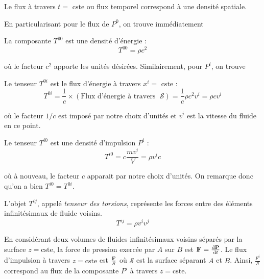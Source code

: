 \begin{theoremframe}
    \begin{defi}
        Le flux à travers $t=\text{ cste}$ ou flux temporel correspond à une densité spatiale. 
    \end{defi}
\end{theoremframe}
En particularisant pour le flux de $P^0$, on trouve immédiatement
\begin{theoremframe}
    \begin{propri}
        La composante $T^{00}$ est une densité d'énergie :
        \begin{equation}
            T^{00}= \rho c^2
        \end{equation}
    \end{propri}
\end{theoremframe}
où le facteur $c^2$ apporte les unités désirées. Similairement, pour $P^i$, on trouve
\begin{theoremframe}
    \begin{propri}
        Le tenseur $T^{0i} $ est le flux d'énergie à travers $x^{i}=\text{ cste}$ :
        \begin{equation}
            T^{0i} =\frac{1}{c} \times (\text{Flux d'énergie à travers } \; \mathcal{S}) = \frac{1}{c} \rho c^2 v^i = \rho c v^i
        \end{equation}
    \end{propri}
\end{theoremframe}
où le facteur $1/c$ est imposé par notre choix d'unités et $v^i$ est la vitesse du fluide en ce point.
\begin{theoremframe}
    \begin{defi}
        Le tenseur $T^{i0}$ est une densité d'impulsion $P^{i}$ :
        \begin{equation}
            T^{i0} = c \frac{m v^i}{V} = \rho v^i c
        \end{equation}
    \end{defi}
\end{theoremframe}
où à nouveau, le facteur $c$ apparait par notre choix d'unités. On remarque donc qu'on a bien $T^{i0} = T^{0i}$.

\begin{theoremframe}
    \begin{defi}
    L'objet $T^{ij}$, appelé \emph{tenseur des torsions}, représente les forces entre des éléments infinitésimaux de fluide voisins.
    \begin{equation}
        T^{ij} = \rho v^i v^j
    \end{equation}
    \end{defi}
\end{theoremframe}
En considérant deux volumes de fluides infinitésimaux voisins séparés par la surface $z = \text{cste}$, la force de pression exercée par $A$ sur $B$ est $\bm{\mathrm{F}} = \frac{\mathrm{d}\bm{\mathrm{P}}}{\mathrm{d} t}$. Le flux d'impulsion à travers $z = \text{cste}$ est $\frac{\bm{\mathrm{F}}}{\mathcal{S}}$ où $\mathcal{S}$ est la surface séparant $A$ et $B$. Ainsi, $\frac{F^{i}}{\mathcal{S}}$ correspond au flux de la composante $P^{i}$ à travers $z = \text{cste}$.

